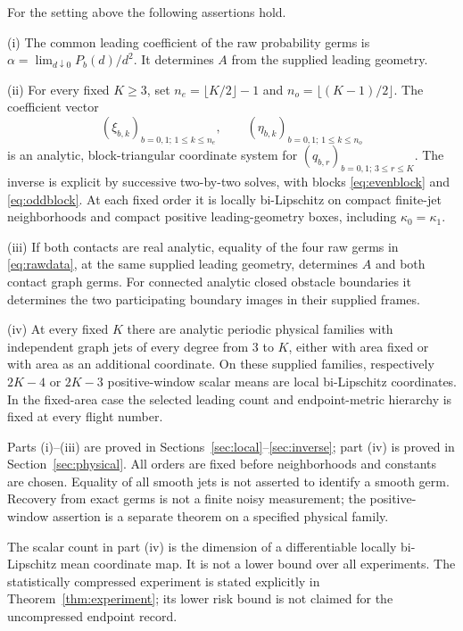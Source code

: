 \begin{theorem}\label{thm:main}
For the setting above the following assertions hold.

\smallskip\noindent
\textup{(i)} The common leading coefficient of the raw probability germs
is $\alpha=\lim_{d\downarrow0}P_b(d)/d^2$. It determines $A$ from the
supplied leading geometry.

\smallskip\noindent
\textup{(ii)} For every fixed $K\ge3$, set
$n_e=\lfloor K/2\rfloor-1$ and $n_o=\lfloor(K-1)/2\rfloor$.
The coefficient vector
\[
 (\xi_{b,k})_{b=0,1;\,1\le k\le n_e},\qquad
 (\eta_{b,k})_{b=0,1;\,1\le k\le n_o}
\]
is an analytic, block-triangular coordinate system for
$(q_{b,r})_{b=0,1;\,3\le r\le K}$.
The inverse is explicit by successive two-by-two solves, with blocks
\eqref{eq:evenblock} and \eqref{eq:oddblock}. At each fixed order it is
locally bi-Lipschitz on compact finite-jet neighborhoods and compact
positive leading-geometry boxes, including $\kappa_0=\kappa_1$.

\smallskip\noindent
\textup{(iii)} If both contacts are real analytic, equality of the four
raw germs in \eqref{eq:rawdata}, at the same supplied leading geometry,
determines $A$ and both contact graph germs. For connected analytic
closed obstacle boundaries it determines the two participating boundary
images in their supplied frames.

\smallskip\noindent
\textup{(iv)} At every fixed $K$ there are analytic periodic physical
families with independent graph jets of every degree from $3$ to $K$,
either with area fixed or with area as an additional coordinate. On
these supplied families, respectively $2K-4$ or $2K-3$ positive-window
scalar means are local bi-Lipschitz coordinates. In the fixed-area
case the selected leading count and endpoint-metric hierarchy is fixed
at every flight number.
\end{theorem}

Parts (i)--(iii) are proved in Sections~\ref{sec:local}--\ref{sec:inverse};
part (iv) is proved in Section~\ref{sec:physical}. All orders are fixed
before neighborhoods and constants are chosen. Equality of all smooth
jets is not asserted to identify a smooth germ. Recovery from exact
germs is not a finite noisy measurement; the positive-window assertion
is a separate theorem on a specified physical family.

The scalar count in part (iv) is the dimension of a differentiable
locally bi-Lipschitz mean coordinate map. It is not a lower bound over
all experiments. The statistically compressed experiment is stated
explicitly in Theorem~\ref{thm:experiment}; its lower risk bound is not
claimed for the uncompressed endpoint record.
